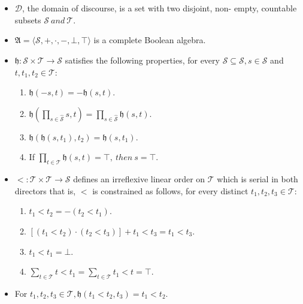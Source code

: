 \begin{itemize}
  \item $\mathcal{D}$, the domain of discourse, is a set with two disjoint, non-
        empty, countable subsets $\mathcal{S}  \ and\  \mathcal{T}$.
  \item $\mathfrak{A} = \langle \mathcal{S}, +, \cdot, -, \bot, \top \rangle $ is a
        complete Boolean algebra.
  \item $\mathfrak{h} : \mathcal{S} \times \mathcal{T} \to \mathcal{S}$ satisfies the following properties,
        for every $\hat{\mathcal{S}} \subseteq \mathcal{S}, s \in \mathcal{S}$ and $t, t_1, t_2 \in \mathcal{T}$:
        \begin{enumerate}
          \item $\mathfrak{h}(-s, t)= -  \mathfrak{h}(s, t)$.
          \item $\displaystyle \mathfrak{h}(\prod_{s\in \hat{\mathcal{S}}} s, t) = \prod_{s\in \hat{\mathcal{S}}} \mathfrak{h}(s, t)$.
          \item $\mathfrak{h}(\mathfrak{h}(s, t_1), t_2) = \mathfrak{h}(s, t_1)$.
          \item If $\displaystyle \prod_{t \in \mathcal{T}} \mathfrak{h}(s, t)= \top, \ then \ s = \top$.
        \end{enumerate}
  \item $< : \mathcal{T} \times \mathcal{T} \to \mathcal{S}$ defines an irreflexive linear order on $\mathcal{T}$ which is serial in both
        directors that is, $<$ is constrained as follows, for every distinct $t_1, t_2, t_3 \in \mathcal{T}$:
        \begin{enumerate}
          \item $t_1 < t_2 = - (t_2 < t_1)$.
          \item $[(t_1 < t_2) \cdot (t_2 < t_3)] + t_1 < t_3 = t_1 < t_3$.
          \item $t_1 < t_1 = \bot$.
          \item $\sum_{t \in \mathcal{T}} t < t_1 = \sum_{t \in \mathcal{T}} t_1 < t = \top$.
        \end{enumerate}
  \item For $t_1, t_2, t_3 \in \mathcal{T}, \mathfrak{h}(t_1 < t_2, t_3) = t_1 < t_2$.
\end{itemize}

